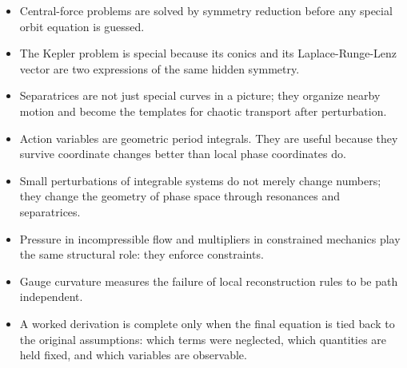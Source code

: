\begin{itemize}
\item Central-force problems are solved by symmetry reduction before any
special orbit equation is guessed.
\item The Kepler problem is special because its conics and its
Laplace-Runge-Lenz vector are two expressions of the same hidden symmetry.
\item Separatrices are not just special curves in a picture; they organize
nearby motion and become the templates for chaotic transport after perturbation.
\item Action variables are geometric period integrals. They are useful because
they survive coordinate changes better than local phase coordinates do.
\item Small perturbations of integrable systems do not merely change numbers;
they change the geometry of phase space through resonances and separatrices.
\item Pressure in incompressible flow and multipliers in constrained mechanics
play the same structural role: they enforce constraints.
\item Gauge curvature measures the failure of local reconstruction rules to be
path independent.
\item A worked derivation is complete only when the final equation is tied back
to the original assumptions: which terms were neglected, which quantities are
held fixed, and which variables are observable.
\end{itemize}
